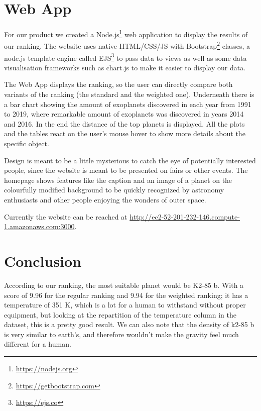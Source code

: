 \documentclass[12p]{article}
\begin{document}

\section{Web App}
For our product we created a Node.js\footnote{\url{https://nodejs.org}} web application to display the results of our ranking. The website uses native HTML/CSS/JS with Bootstrap\footnote{\url{https://getbootstrap.com}} classes, a node.js template engine called EJS\footnote{\url{https://ejs.co}} to pass data to views as well as some data visualisation frameworks such as chart.js to make it easier to display our data.

The Web App displays the ranking, so the user can directly compare both variants of the ranking (the standard and the weighted one). Underneath there is a bar chart showing the amount of exoplanets discovered in each year from 1991 to 2019, where remarkable amount of exoplanets was discovered in years 2014 and 2016. In the end the distance of the top  planets is displayed. All the plots and the tables react on the user's mouse hover to show more details about the specific object.

Design is meant to be a little mysterious to catch the eye of potentially interested people, since the website is meant to be presented on fairs or other events. The homepage shows features like the caption and an image of a planet on the colourfully modified background to be quickly recognized by astronomy enthusiasts and other people enjoying the wonders of outer space.

Currently the website can be reached at \url{http://ec2-52-201-232-146.compute-1.amazonaws.com:3000}.


\section{Conclusion}
According to our ranking, the most suitable planet would be K2-85 b. With a score of 9.96 for the regular ranking and 9.94 for the weighted ranking; it has a temperature of 351 K, which is a lot for a human to withstand without proper equipment, but looking at the repartition of the temperature column in the dataset, this is a pretty good result. We can also note that the density of k2-85 b is very similar to earth's, and therefore wouldn't make the gravity feel much different for a human.
\end{document}
